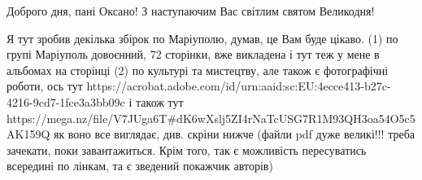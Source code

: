  
 
 
 
 

Доброго дня, пані Оксано! З наступаючим Вас світлим святом Великодня!

Я тут зробив декілька збірок по Маріуполю, думав, це Вам буде цікаво. (1) по
групі Маріуполь довоєнний, 72 сторінки, вже викладена і тут теж у мене в
альбомах на сторінці (2) по культурі та мистецтву, але також є фотографічні
роботи, ось тут
https://acrobat.adobe.com/id/urn:aaid:sc:EU:4ecce413-b27c-4216-9cd7-1fce3a3bb09c
і також тут
https://mega.nz/file/V7JUga6T#dK6wXslj5ZI4rNaTcUSG7R1M93QH3oa54O5c5AK159Q як
воно все виглядає, див. скріни нижче (файли pdf дуже великі!!! треба зачекати,
поки завантажиться. Крім того, так є можливість пересуватись всередині по
лінкам, та є зведений покажчик авторів)
